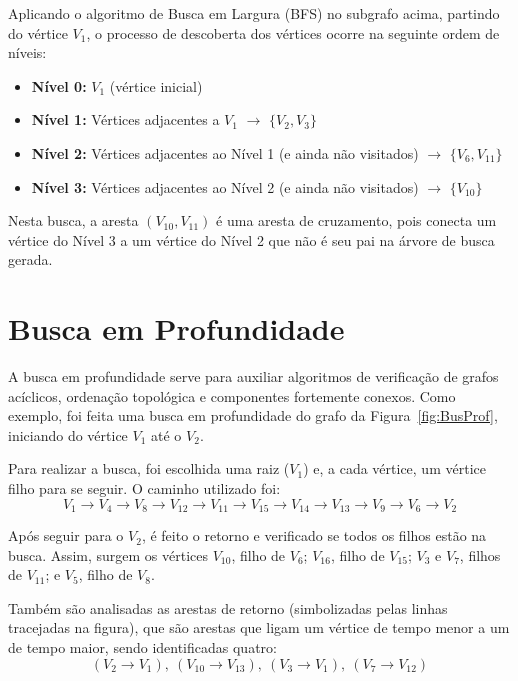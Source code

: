 Aplicando o algoritmo de Busca em Largura (BFS) no subgrafo acima, partindo do vértice $V_1$, o processo de descoberta dos vértices ocorre na seguinte ordem de níveis:

\begin{itemize}
    \item \textbf{Nível 0:} $V_{1}$ (vértice inicial)
    \item \textbf{Nível 1:} Vértices adjacentes a $V_{1}$ $\rightarrow$ $\{V_{2}, V_{3}\}$
    \item \textbf{Nível 2:} Vértices adjacentes ao Nível 1 (e ainda não visitados) $\rightarrow$ $\{V_{6}, V_{11}\}$
    \item \textbf{Nível 3:} Vértices adjacentes ao Nível 2 (e ainda não visitados) $\rightarrow$ $\{V_{10}\}$
\end{itemize}

Nesta busca, a aresta $(V_{10}, V_{11})$ é uma aresta de cruzamento, pois conecta um vértice do Nível 3 a um vértice do Nível 2 que não é seu pai na árvore de busca gerada.


    \section{Busca em Profundidade}\label{sec:buscaProf}
A busca em profundidade serve para auxiliar algoritmos de verificação de grafos acíclicos, ordenação topológica e componentes fortemente conexos.
Como exemplo, foi feita uma busca em profundidade do grafo da Figura~\ref{fig:BusProf}, iniciando do vértice $V_1$ até o $V_2$.

Para realizar a busca, foi escolhida uma raiz ($V_1$) e, a cada vértice, um vértice filho para se seguir.
O caminho utilizado foi:
\[
V_1 \rightarrow V_4 \rightarrow V_8 \rightarrow V_{12} \rightarrow V_{11} \rightarrow V_{15} \rightarrow V_{14} \rightarrow V_{13} \rightarrow V_9 \rightarrow V_6 \rightarrow V_2
\]

Após seguir para o $V_2$, é feito o retorno e verificado se todos os filhos estão na busca. Assim, surgem os vértices $V_{10}$, filho de $V_6$; $V_{16}$, filho de $V_{15}$; $V_3$ e $V_7$, filhos de $V_{11}$; e $V_5$, filho de $V_8$.

Também são analisadas as arestas de retorno (simbolizadas pelas linhas tracejadas na figura), que são arestas que ligam um vértice de tempo menor a um de tempo maior, sendo identificadas quatro:
\[
(V_2 \rightarrow V_1),\ (V_{10} \rightarrow V_{13}),\ (V_3 \rightarrow V_1),\ (V_7 \rightarrow V_{12})
\]

